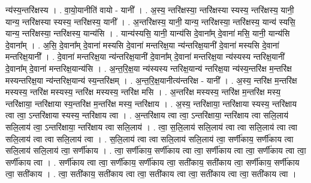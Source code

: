 \documentclass[17pt]{extarticle}
\begin{document}
न्य॑स्य॒न्तरि॑क्षस्य । . वा॒यो॒यानीति॑ वायो - यानी᳚ । . अ॒स्य॒ न्तरि॑क्षस्या॒ न्तरि॑क्षस्या स्यस्य॒ न्तरि॑क्षस्य॒ यानी॒ यान्य॒ न्तरि॑क्षस्या स्यस्य॒ न्तरि॑क्षस्य॒ यानी᳚ । . अ॒न्तरि॑क्षस्य॒ यानी॒ यान्य॒ न्तरि॑क्षस्या॒ न्तरि॑क्षस्य॒ यान्य॑ स्यसि॒ यान्य॒ न्तरि॑क्षस्या॒ न्तरि॑क्षस्य॒ यान्य॑सि । . यान्य॑स्यसि॒ यानी॒ यान्य॑सि दे॒वाना᳚म् दे॒वाना॑ मसि॒ यानी॒ यान्य॑सि दे॒वाना᳚म् । . अ॒सि॒ दे॒वाना᳚म् दे॒वाना॑ मस्यसि दे॒वाना॑ मन्तरिक्ष॒या न्य॑न्तरिक्ष॒यानी॑ दे॒वाना॑ मस्यसि दे॒वाना॑ मन्तरिक्ष॒यानी᳚ । . दे॒वाना॑ मन्तरिक्ष॒या न्य॑न्तरिक्ष॒यानी॑ दे॒वाना᳚म् दे॒वाना॑ मन्तरिक्ष॒या न्य॑स्यस्य न्तरिक्ष॒यानी॑ दे॒वाना᳚म् दे॒वाना॑ मन्तरिक्ष॒यान्य॑सि । . अ॒न्त॒रि॒क्ष॒या न्य॑स्यस्य न्तरिक्ष॒यान्य॑ न्तरिक्ष॒या न्य॑स्य॒न्तरि॑क्ष म॒न्तरि॑क्ष मस्यन्तरिक्ष॒या
न्य॑न्तरिक्ष॒यान्य॑ स्य॒न्तरि॑क्षम् । . अ॒न्त॒रि॒क्ष॒यानीत्य॑न्तरिक्ष - यानी᳚ । . अ॒स्य॒ न्तरि॑क्ष म॒न्तरि॑क्ष मस्यस्य॒ न्तरि॑क्ष मस्यस्य॒ न्तरि॑क्ष मस्यस्य॒ न्तरि॑क्ष मसि । . अ॒न्तरि॑क्ष मस्यस्य॒ न्तरि॑क्ष म॒न्तरि॑क्ष मस्य॒ न्तरि॑क्षाया॒ न्तरि॑क्षाया स्य॒न्तरि॑क्ष म॒न्तरि॑क्ष मस्य॒ न्तरि॑क्षाय । . अ॒स्य॒ न्तरि॑क्षाया॒ न्तरि॑क्षाया स्यस्य॒ न्तरि॑क्षाय त्वा त्वा॒ ऽन्तरि॑क्षाया स्यस्य॒ न्तरि॑क्षाय त्वा । . अ॒न्तरि॑क्षाय त्वा त्वा॒ ऽन्तरि॑क्षाया॒ न्तरि॑क्षाय त्वा सलि॒लाय॑ सलि॒लाय॑ त्वा॒ ऽन्तरि॑क्षाया॒ न्तरि॑क्षाय त्वा सलि॒लाय॑ । . त्वा॒ स॒लि॒लाय॑ सलि॒लाय॑ त्वा त्वा सलि॒लाय॑ त्वा त्वा सलि॒लाय॑ त्वा त्वा सलि॒लाय॑ त्वा । . स॒लि॒लाय॑ त्वा त्वा सलि॒लाय॑ सलि॒लाय॑ त्वा॒ सर्णी॑काय॒ सर्णी॑काय त्वा सलि॒लाय॑ सलि॒लाय॑ त्वा॒ सर्णी॑काय । . त्वा॒ सर्णी॑काय॒ सर्णी॑काय त्वा त्वा॒ सर्णी॑काय त्वा त्वा॒ सर्णी॑काय त्वा त्वा॒ सर्णी॑काय त्वा । . सर्णी॑काय त्वा त्वा॒ सर्णी॑काय॒ सर्णी॑काय त्वा॒ सती॑काय॒ सती॑काय त्वा॒ सर्णी॑काय॒ सर्णी॑काय त्वा॒ सती॑काय । . त्वा॒ सती॑काय॒ सती॑काय त्वा त्वा॒ सती॑काय त्वा त्वा॒ सती॑काय त्वा त्वा॒ सती॑काय त्वा । \newline
\end{document}

